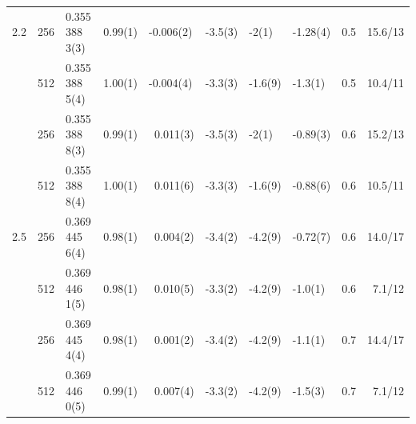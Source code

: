 \documentclass[11pt]{article}
\begin{document}
\begin{table}[htbp]
{\begin{tabular}{l|lllllllll}
        2.2 & 256 & 0.355 388 3(3) &0.99(1) & -0.006(2) & -3.5(3) &-2(1) &	-1.28(4) & 0.5	& 15.6/13   \\ 
        ~ & 512 & 0.355 388 5(4)  & 1.00(1)	&-0.004(4)	&-3.3(3)	&-1.6(9) & -1.3(1) &  0.5 & 10.4/11  \\ 
        ~ & 256 & 0.355 388 8(3) & 0.99(1) &	~0.011(3) &	-3.5(3) &	-2(1) &	-0.89(3) &  0.6 &	15.2/13  \\ 
        ~ & 512 & 0.355 388 8(4) & 1.00(1) &	~0.011(6) &	-3.3(3) &	-1.6(9) &-0.88(6) & 0.6 & 10.5/11  \\ \hline
        2.5 & 256 & 0.369 445 6(4) & 0.98(1) & ~0.004(2) & -3.4(2) & -4.2(9) & -0.72(7)  & 0.6 & 14.0/17  \\ 
        ~ & 512 & 0.369 446 1(5) & 0.98(1) & ~0.010(5) & -3.3(2) & -4.2(9) & -1.0(1)  & 0.6 & ~7.1/12  \\ 
        ~ & 256 & 0.369 445 4(4) & 0.98(1) & ~0.001(2) & -3.4(2) & -4.2(9) & -1.1(1)  & 0.7 & 14.4/17  \\ 
        ~ & 512 & 0.369 446 0(5) & 0.99(1) & ~0.007(4) & -3.3(2) & -4.2(9) & -1.5(3)  & 0.7 & ~7.1/12  \\
        \hline\hline
    \end{tabular}
}
\end{table}
\end{document}
